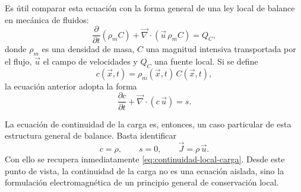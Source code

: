 \documentclass[12pt,a4paper]{article}
\theoremstyle{definition}
\theoremstyle{plain}
\numberwithin{equation}{section}
\theoremstyle{remark}
\begin{document}
Es útil comparar esta ecuación con la forma general de una ley local de balance en mecánica de fluidos:
\begin{equation*}
    \frac{\partial}{\partial t}(\rho_m C)+\vec\nabla\cdot(\vec u\,\rho_m C)=Q_C,
\end{equation*}
donde $\rho_m$ es una densidad de masa, $C$ una magnitud intensiva transportada por el flujo, $\vec u$ el campo de velocidades y $Q_C$ una fuente local. Si se define
\begin{equation*}
    c(\vec x,t)=\rho_m(\vec x,t)\,C(\vec x,t),
\end{equation*}
la ecuación anterior adopta la forma
\begin{equation*}
    \frac{\partial c}{\partial t}+\vec\nabla\cdot(c\,\vec u)=s.
\end{equation*}

La ecuación de continuidad de la carga es, entonces, un caso particular de esta estructura general de balance. Basta identificar
\begin{equation*}
    c=\rho,
    \qquad
    s=0,
    \qquad
    \vec J=\rho\,\vec u.
\end{equation*}
Con ello se recupera inmediatamente \eqref{eq:continuidad-local-carga}. Desde este punto de vista, la continuidad de la carga no es una ecuación aislada, sino la formulación electromagnética de un principio general de conservación local.
\end{document}
